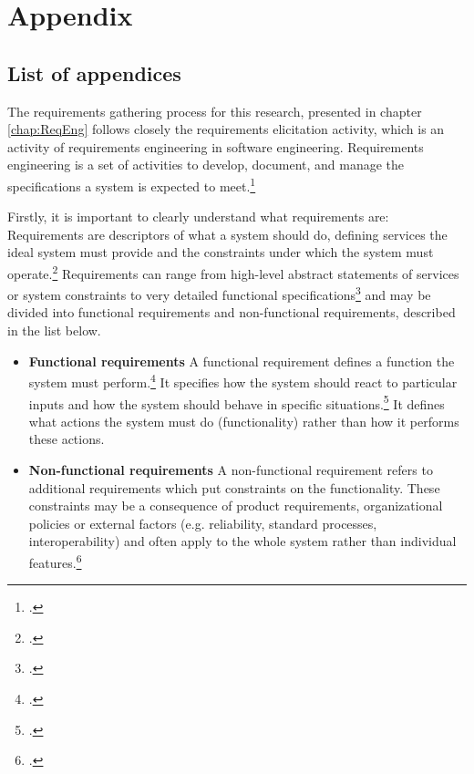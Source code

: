 \chapter*{Appendix}
\section*{List of appendices}
\vspace{-8em}
\listofanhang
\clearpage
{} %


 \label{anhang:ReqEng}

The requirements gathering process for this research, presented in chapter \ref{chap:ReqEng} follows closely the requirements elicitation activity, which is an activity of requirements engineering in software engineering. Requirements engineering is a set of activities to develop, document, and manage the specifications a system is expected to meet.\footcites[Cf.][p.16]{SommervilleIntegratedrequirementsengineering2005}[cf.][p.38]{PatakiSystemRequirementsAnalysis2003}

Firstly, it is important to clearly understand what requirements are: Requirements are descriptors of what a system should do, defining services the ideal system must provide and the constraints under which the system must operate.\footcites[Cf.][p.100]{SommervilleSoftwareengineering2011}[cf.][p.95]{IEEEIEEEstandardglossary1990} Requirements can range from high-level abstract statements of services or system constraints to very detailed functional specifications\footcite[Cf.][p.215]{DavisSoftwarerequirementsobjects1993} and may be divided into functional requirements and non-functional requirements, described in the list below.

\begin{itemize}
    \item \textbf{Functional requirements} A functional requirement defines a function the system must perform.\footcite[Cf.][p.34]{IEEEIEEEstandardglossary1990} It specifies how the system should react to particular inputs and how the system should behave in specific situations.\footcite[Cf.][p.102]{SommervilleSoftwareengineering2011} It defines what actions the system must do (functionality) rather than how it performs these actions. 
    \item \textbf{Non-functional requirements} A non-functional requirement refers to additional requirements which put constraints on the functionality. These constraints may be a consequence of product requirements, organizational policies or external factors (e.g. reliability, standard processes, interoperability) and often apply to the whole system rather than individual features.\footcite[Cf.][p.102]{SommervilleSoftwareengineering2011}
\end{itemize}

